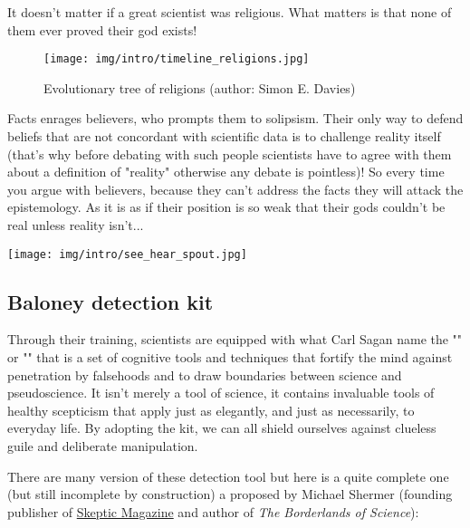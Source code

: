 	\begin{fquote}It doesn't matter if a great scientist was religious. What matters is that none of them ever proved their god exists!
 	\end{fquote}
 	
 	
 	\begin{figure}[H]
		\centering
		\texttt{[image: img/intro/timeline\_religions.jpg]}
		\caption[Evolutionary tree of religions]{Evolutionary tree of religions (author: Simon E. Davies)}
	\end{figure} 
	Facts enrages believers, who prompts them to solipsism. Their only way to defend beliefs that are not concordant with scientific data is to challenge reality itself (that's why before debating with such people scientists have to agree with them about a definition of "reality" otherwise any debate is pointless)! So every time you argue with believers, because they can't address the facts they will attack the epistemology. As it is as if their position is so weak that their gods couldn't be real unless reality isn't...
	
	\begin{center}
		\texttt{[image: img/intro/see\_hear\_spout.jpg]}
	\end{center}	
	
	\pagebreak
	\subsection{Baloney detection kit}
	Through their training, scientists are equipped with what Carl Sagan name the "" or "" that is a set of cognitive tools and techniques that fortify the mind against penetration by falsehoods and to draw boundaries between science and pseudoscience. It isn't merely a tool of science, it contains invaluable tools of healthy scepticism that apply just as elegantly, and just as necessarily, to everyday life. By adopting the kit, we can all shield ourselves against clueless guile and deliberate manipulation. 

	There are many version of these detection tool but here is a quite complete one (but still incomplete by construction) a proposed by Michael Shermer (founding publisher of \href{http://www.skeptic.com}{Skeptic Magazine} and author of \textit{The Borderlands of Science}):
	
